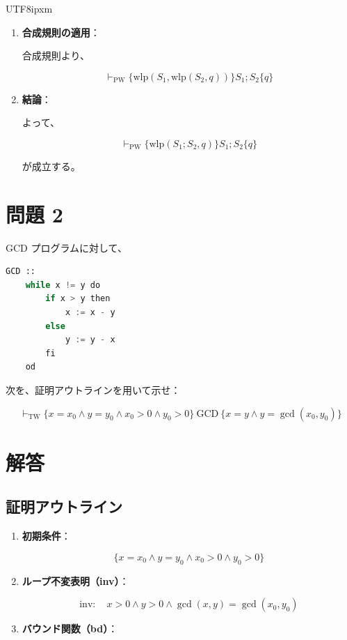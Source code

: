 \documentclass[12pt,a4paper]{article}
\begin{document}
\begin{CJK}{UTF8}{ipxm}
\begin{enumerate}
    \item \textbf{合成規則の適用}：

    合成規則より、

    \[
    \vdash_{\text{PW}} \{ \text{wlp}(S_1, \text{wlp}(S_2, q)) \} S_1; S_2 \{ q \}
    \]

    \item \textbf{結論}：

    よって、

    \[
    \vdash_{\text{PW}} \{ \text{wlp}(S_1; S_2, q) \} S_1; S_2 \{ q \}
    \]

    が成立する。

\end{enumerate}

\section*{問題 2}

GCD プログラムに対して、

\begin{lstlisting}[language=Python]
GCD ::
    while x != y do
        if x > y then
            x := x - y
        else
            y := y - x
        fi
    od
\end{lstlisting}

次を、証明アウトラインを用いて示せ：

\[
\vdash_{\text{TW}} \{ x = x_0 \land y = y_0 \land x_0 > 0 \land y_0 > 0 \} \ \text{GCD} \ \{ x = y \land y = \gcd(x_0, y_0) \}
\]

\section*{解答}

\subsection*{証明アウトライン}

\begin{enumerate}
    \item \textbf{初期条件}：

    \[
    \{ x = x_0 \land y = y_0 \land x_0 > 0 \land y_0 > 0 \}
    \]

    \item \textbf{ループ不変表明（inv）}：

    \[
    \text{inv} :\quad x > 0 \land y > 0 \land \gcd(x, y) = \gcd(x_0, y_0)
    \]

    \item \textbf{バウンド関数（bd）}：


\end{enumerate}
\end{CJK}
\end{document}
